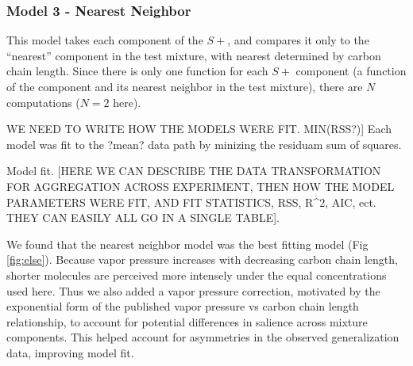 \subsubsection{Model 3 - Nearest Neighbor}
This model takes each component of the $S+$, and compares it only to the ``nearest'' component in the test mixture, with nearest determined by carbon chain length.  Since there is only one function for each $S+$ component (a function of the component and its nearest neighbor in the test mixture), there are $N$ computations ($N=2$ here).  

WE NEED TO WRITE HOW THE MODELS WERE FIT. MIN(RSS?)] Each model was fit to the ?mean? data path by minizing the residuam sum of squares.

Model fit. [HERE WE CAN DESCRIBE THE DATA TRANSFORMATION FOR AGGREGATION ACROSS EXPERIMENT, THEN HOW THE MODEL PARAMETERS WERE FIT, AND FIT STATISTICS, RSS, R^2, AIC, ect. THEY CAN EASILY ALL GO IN A SINGLE TABLE]. 

We found that the nearest neighbor model was the best fitting model (Fig \ref{fig:else}).  Because vapor pressure increases with decreasing carbon chain length, shorter molecules are perceived more intensely under the equal concentrations used here.  Thus we also added a vapor pressure correction, motivated by the exponential form of the published vapor pressure vs carbon chain length relationship, to account for potential differences in salience across mixture components.  This helped account for asymmetries in the observed generalization data, improving model fit.  